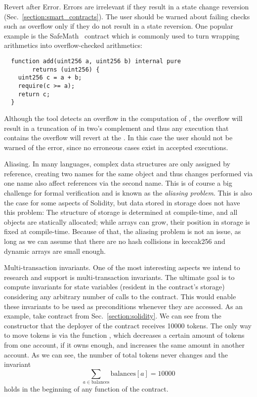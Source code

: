 \begin{paragraph}{Revert after Error.}
Errors are irrelevant if they result in a state change reversion
(Sec.~\ref{section:smart_contracts}). The user should be warned
about failing checks such as overflow only if they do not result in a state reversion.
%
One popular example is the SafeMath~\cite{SafeMath} contract which
is commonly used to turn wrapping arithmetics into overflow-checked arithmetics:

\begin{verbatim}
  function add(uint256 a, uint256 b) internal pure
        returns (uint256) {
    uint256 c = a + b;
    require(c >= a);
    return c;
  }
\end{verbatim}

Although the tool detects an overflow in the computation of ,
the overflow will result in a truncation of  in two's complement and thus
any execution that contains the overflow will revert at the .
%
In this case the user should not be warned of the error, since no erroneous cases
exist in accepted executions.
\end{paragraph}

\begin{paragraph}{Aliasing.}
In many languages, complex data structures are only assigned by
reference, creating two names for the same object and thus changes
performed via one name also affect references via the second name.
This is of course a big challenge for formal verification and
is known as the \emph{aliasing problem}.
This is also the case for some aspects of Solidity, but data stored
in storage does not have this problem: The structure of
storage is determined at compile-time, and all objects are
statically allocated; while arrays can grow, their position in
storage is fixed at compile-time. Because of that, the aliasing problem
is not an issue, as long as we can assume that there are no hash
collisions in keccak256 and dynamic arrays are small enough.
\end{paragraph}

\begin{paragraph}{Multi-transaction invariants.}
One of the most interesting aspects we intend to research and support is
multi-transaction invariants.
%
The ultimate goal is to compute invariants for state variables (resident in the
contract's storage) considering any arbitrary number of calls to the contract.
%
This would enable these invariants to be used as preconditions whenever they
are accessed.
%
As an example, take contract  from Sec.~\ref{section:solidity}.
%
We can see from the constructor that the deployer of the contract receives
10000 tokens.
%
The only way to move tokens is via the function , which decreases a
certain amount of tokens from one account, if it owns enough, and increases the
same amount in another account.
%
As we can see, the number of total tokens never changes and the invariant
$$\sum_{a \in \mathrm{balances}} \mathrm{balances}[a] = 10000$$ holds in the beginning of any
function of the contract.

\end{paragraph}

